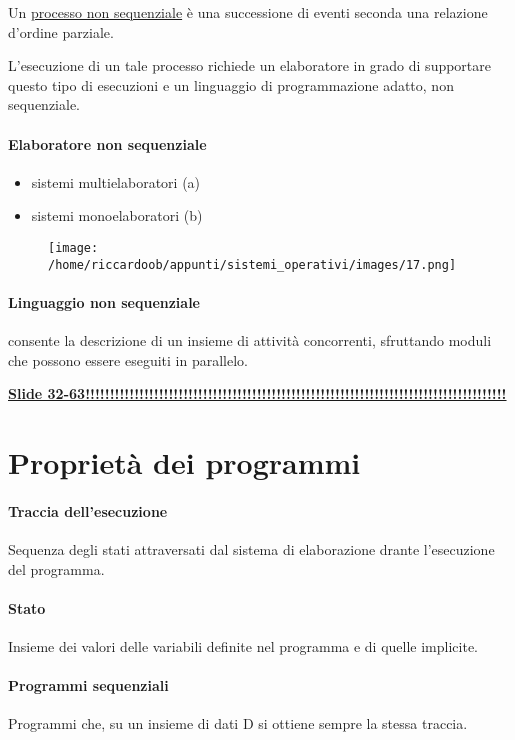 Un \underline{processo non sequenziale} è una successione di eventi seconda una relazione d'ordine parziale.

L'esecuzione di un tale processo richiede un elaboratore in grado di supportare questo tipo di esecuzioni e un linguaggio di  programmazione adatto, non sequenziale.

\paragraph{Elaboratore non sequenziale}
\begin{itemize}
    \item sistemi multielaboratori (a)
    \item sistemi monoelaboratori (b)

\end{itemize}

\begin{figure}[H]
    \centering
    \texttt{[image: /home/riccardoob/appunti/sistemi\_operativi/images/17.png]}
\end{figure}

\paragraph{Linguaggio non sequenziale} consente la descrizione di un insieme di attività concorrenti, sfruttando moduli che possono essere eseguiti in parallelo.

\underline{\textbf{Slide 32-63!!!!!!!!!!!!!!!!!!!!!!!!!!!!!!!!!!!!!!!!!!!!!!!!!!!!!!!!!!!!!!!!!!!!!!!!!!!!!!!!!!!!!!} } 

\section{Proprietà dei programmi}

\paragraph{Traccia dell'esecuzione} Sequenza degli stati attraversati dal sistema di elaborazione drante l'esecuzione del programma.

\paragraph{Stato} Insieme dei valori delle variabili definite nel programma e di quelle implicite.

\paragraph{Programmi sequenziali} Programmi che, su un insieme di dati D si ottiene sempre la stessa traccia.

